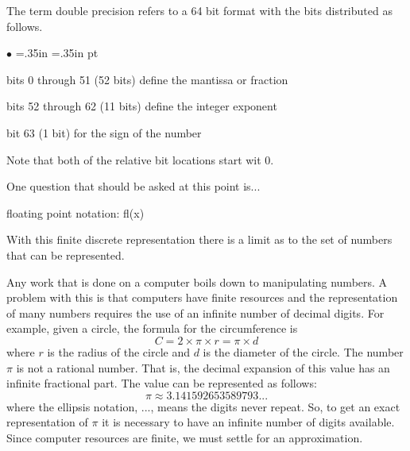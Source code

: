 \documentclass[10pt,fleqn]{article}
\begin{document}
The term double precision refers to a 64 bit format with the bits distributed as
follows.
\begin{list}{$\bullet$}{ \parsep=0pt \listparindent=0pt
\topsep=0pt \rightmargin=.35in \leftmargin=.35in  pt
\itemsep=2pt}
  \item bits 0 through 51 (52 bits) define the mantissa or fraction
  \item bits 52 through 62 (11 bits) define the integer exponent
  \item bit 63 (1 bit) for the sign of the number
\end{list}
Note that both of the relative bit locations start wit $0$.

One question that should be asked at this point is...







floating point notation:   fl(x)





With this finite discrete representation there is a limit as to the set of
numbers that can be represented.














Any work that is done on a computer boils down to manipulating numbers. A
problem with this is that computers have finite resources and the representation
of many numbers requires the use of an infinite number of decimal digits. For
example, given a circle, the formula for the circumference is
$$C = 2 \times \pi \times r = \pi \times d$$
where $r$ is the radius of the circle and $d$ is the diameter of the circle. The
number $\pi$ is not a rational number. That is, the decimal expansion of this
value has an infinite fractional part. The value can be represented as follows:
$$\pi\approx 3.141592653589793...$$
where the ellipsis notation, $...$, means the digits never repeat. So, to get an
exact representation of $\pi$ it is necessary to have an infinite number of
digits available. Since computer resources are finite, we must settle for an
approximation.
\end{document}
